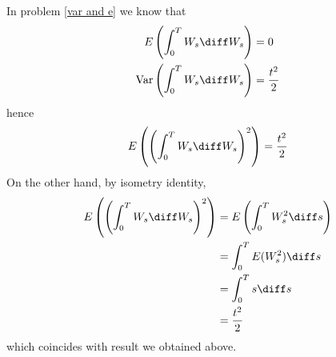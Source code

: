    \problem
    In problem \ref{var and e} we know that
    \[\begin{aligned}
        E\left(\int_0^TW_s\diff W_s\right)&=0\\
        \var\left(\int_0^TW_s\diff W_s\right)&=\frac{t^2}{2}
    \end{aligned}\]
    hence
    \[E\left(\left(\int_0^TW_s\diff W_s\right)^2\right)=\frac{t^2}{2}\]
    On the other hand, by isometry identity,
    \[\begin{aligned}
        E\left(\left(\int_0^TW_s\diff W_s\right)^2\right)
        &=E\left(\int_0^TW_s^2\diff s\right)\\
        &=\int_0^TE(W_s^2)\diff s\\
        &=\int_0^Ts\diff s\\
        &=\frac{t^2}{2}
    \end{aligned}\]
    which coincides with result we obtained above.

